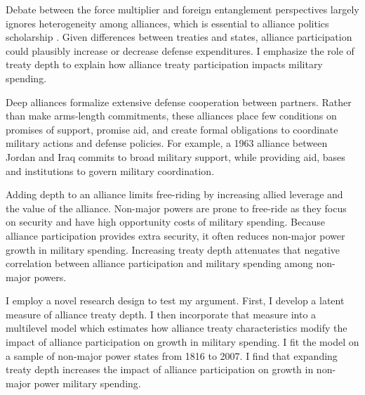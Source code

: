 \documentclass[12pt]{article}
\begin{document}
Debate between the force multiplier and foreign entanglement perspectives largely ignores heterogeneity among alliances, which is essential to alliance politics scholarship \citep{Morrow1991, Leeds2003, LeedsAnac2005, Fordham2010, Mattes2012, Benson2012, Poast2013, Johnsonetal2015}.  
Given differences between treaties and states, alliance participation could plausibly increase or decrease defense expenditures. 
I emphasize the role of treaty depth to explain how alliance treaty participation impacts military spending. 


Deep alliances formalize extensive defense cooperation between partners.
Rather than make arms-length commitments, these alliances place few conditions on promises of support, promise aid, and create formal obligations to coordinate military actions and defense policies. 
For example, a 1963 alliance between Jordan and Iraq commits to broad military support, while providing aid, bases and institutions to govern military coordination. 


Adding depth to an alliance limits free-riding by increasing allied leverage and the value of the alliance. 
Non-major powers are prone to free-ride as they focus on security and have high opportunity costs of military spending. 
Because alliance participation provides extra security, it often reduces non-major power growth in military spending. 
Increasing treaty depth attenuates that negative correlation between alliance participation and military spending among non-major powers. 
 



I employ a novel research design to test my argument.
First, I develop a latent measure of alliance treaty depth. 
I then incorporate that measure into a multilevel model which estimates how alliance treaty characteristics modify the impact of alliance participation on growth in military spending.
I fit the model on a sample of non-major power states from 1816 to 2007. 
I find that expanding treaty depth increases the impact of alliance participation on growth in non-major power military spending.
\end{document}
